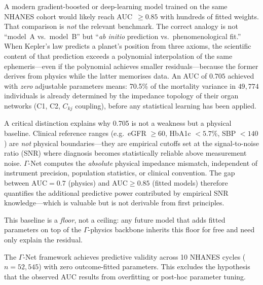 \documentclass[aps,pre,twocolumn,superscriptaddress,floatfix]{revtex4-2}
\begin{document}
\begin{remark}[On the meaning of AUC $= 0.705$
  without fitted parameters \textnormal{(E1)}]
\label{rem:auc-meaning}
A modern gradient-boosted or deep-learning model
trained on the same NHANES cohort would likely
reach AUC~$\geq 0.85$ with hundreds of fitted
weights.
That comparison is \emph{not} the relevant benchmark.
The correct analogy is not ``model~A vs.\ model~B''
but ``\emph{ab initio} prediction vs.\
phenomenological fit.''
When Kepler's law predicts a planet's position
from three axioms, the scientific content of
that prediction exceeds a polynomial interpolation
of the same ephemeris---even if the polynomial
achieves smaller residuals---because the former
derives from physics while the latter memorises data.
An AUC of $0.705$ achieved with \emph{zero}
adjustable parameters means: 70.5\% of the
mortality variance in $49{,}774$ individuals is
already determined by the impedance topology of
their organ networks (C1, C2, $C_{kj}$ coupling),
before any statistical learning has been applied.

A critical distinction explains why 0.705 is
not a weakness but a physical baseline.
Clinical reference ranges (e.g.\ eGFR $\geq 60$,
HbA1c $< 5.7\%$, SBP $< 140$) are
\emph{not} physical boundaries---they are
empirical cutoffs set at the signal-to-noise
ratio (SNR) where diagnosis becomes statistically
reliable above measurement noise.
$\Gamma$-Net computes the \emph{absolute} physical
impedance mismatch, independent of instrument
precision, population statistics, or clinical
convention.
The gap between $\text{AUC} = 0.7$ (physics) and
$\text{AUC} \geq 0.85$ (fitted models) therefore
quantifies the additional predictive power
contributed by empirical SNR knowledge---which
is valuable but is not derivable from first
principles.

This baseline is a \emph{floor}, not a ceiling:
any future model that adds fitted parameters on top
of the $\Gamma$-physics backbone inherits this floor
for free and need only explain the residual.
\end{remark}

\begin{corollary}
\label{cor:zero-param}
The $\Gamma$-Net framework achieves predictive
validity across 10 NHANES cycles ($n = 52{,}545$)
with zero outcome-fitted parameters.
This excludes the hypothesis that the observed AUC
results from overfitting or post-hoc parameter tuning.
\end{corollary}
\end{document}
